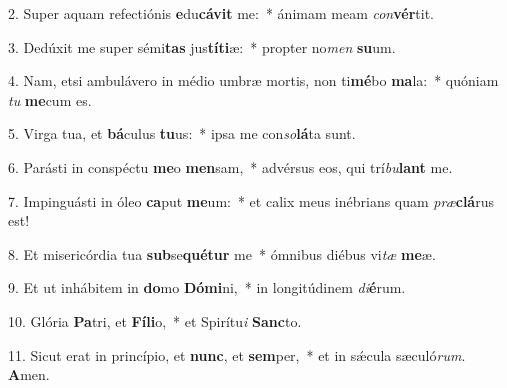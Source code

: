 2. Super aquam refectiónis \textbf{e}du\textbf{cá}\textbf{vit} me:~*  ánimam meam \textit{con}\textbf{vér}tit.\

3. Dedúxit me super sémi\textbf{tas} jus\textbf{tí}\textbf{ti}æ:~*  propter no\textit{men} \textbf{su}um.\

4. Nam, etsi ambulávero in médio umbræ mortis, non ti\textbf{mé}bo \textbf{ma}la:~*  quóniam \textit{tu} \textbf{me}cum es.\

5. Virga tua, et \textbf{bá}culus \textbf{tu}us:~*  ipsa me con\textit{so}\textbf{lá}ta sunt.\

6. Parásti in conspéctu \textbf{me}o \textbf{men}sam,~*  advérsus eos, qui trí\textit{bu}\textbf{lant} me.\

7. Impinguásti in óleo \textbf{ca}put \textbf{me}um:~*  et calix meus inébrians quam \textit{præ}\textbf{clá}rus est!\

8. Et misericórdia tua \textbf{sub}se\textbf{qué}\textbf{tur} me~*  ómnibus diébus vi\textit{tæ} \textbf{me}æ.\

9. Et ut inhábitem in \textbf{do}mo \textbf{Dó}\textbf{mi}ni,~*  in longitúdinem \textit{di}\textbf{é}rum.\

10. Glória \textbf{Pa}tri, et \textbf{Fí}\textbf{li}o,~*  et Spirítu\textit{i} \textbf{Sanc}to.\

11. Sicut erat in princípio, et \textbf{nunc}, et \textbf{sem}per,~*  et in sǽcula sæculó\textit{rum}. \textbf{A}men.\


